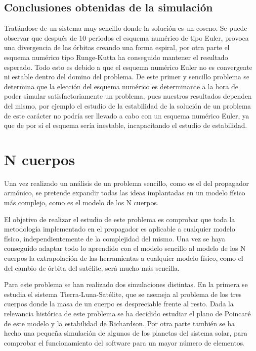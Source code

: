 \documentclass[11pt,singlespacing,liststotoc,headsepline,a4paper]{article}
\begin{document}
\subsection{Conclusiones obtenidas de la simulación}

Tratándose de un sistema muy sencillo donde la solución es un coseno. Se puede observar que después de 10 periodos el esquema numérico de tipo Euler, provoca una divergencia de las órbitas creando una forma espiral, por otra parte el esquema numérico tipo Runge-Kutta ha conseguido mantener el resultado esperado. Todo esto es debido a que el esquema numérico Euler no es convergente ni estable dentro del domino del problema. De este primer y sencillo problema se determina que la elección del esquema numérico es determinante a la hora de poder simular satisfactoriamente un problema, pues nuestros resultados dependen del mismo, por ejemplo el estudio de la estabilidad de la solución de un problema de este carácter no podría ser llevado a cabo con un esquema numérico Euler, ya que de por sí el esquema sería inestable, incapacitando el estudio de estabilidad.

	\newpage

\section{N cuerpos}
Una vez realizado un análisis de un problema sencillo, como es el del propagador armónico, se pretende expandir todas las ideas implantadas en un modelo físico más complejo, como es el modelo de los N cuerpos.

El objetivo de realizar el estudio de este problema es comprobar que toda la metodología implementado en el propagador es aplicable a cualquier modelo físico, independientemente de la complejidad del mismo. Una vez se haya conseguido adaptar todo lo aprendido con el modelo sencillo al modelo de los N cuerpos la extrapolación de las herramientas a cualquier modelo físico, como el del cambio de órbita del satélite, será mucho más sencilla.

Para este problema se han realizado dos simulaciones distintas. En la primera se estudia el sistema Tierra-Luna-Satélite, que se asemeja al problema de los tres cuerpos donde la masa de un cuerpo es despreciable frente al resto. Dada la relevancia histórica de este problema se ha decidido estudiar el plano de Poincaré de este modelo y la estabilidad de Richardson. Por otra parte también se ha hecho una pequeña simulación de algunos de los planetas del sistema solar, para comprobar el funcionamiento del software para un mayor número de elementos.
\end{document}
